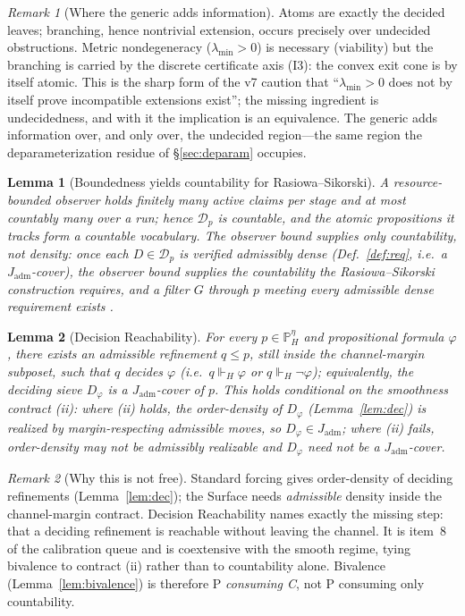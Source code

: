\documentclass[11pt]{article}
\newtheorem{lemma}{Lemma}
\theoremstyle{definition}
\theoremstyle{remark}
\newtheorem*{remark}{Remark}
\newcommand{\forcesH}{\Vdash_{H}}
\newcommand{\PHeta}{\mathbb{P}_{H}^{\eta}}
\newcommand{\refines}{\leq}
\newcommand{\lmin}{\lambda_{\min}}
\newcommand{\Jadm}{J_{\mathrm{adm}}}
\begin{document}
\begin{remark}[Where the generic adds information]
Atoms are exactly the decided leaves; branching, hence nontrivial extension, occurs precisely over
undecided obstructions. Metric nondegeneracy ($\lmin>0$) is necessary (viability) but the branching
is carried by the discrete certificate axis (I3): the convex exit cone is by itself atomic. This is
the sharp form of the v7 caution that ``$\lmin>0$ does not by itself prove incompatible extensions
exist''; the missing ingredient is undecidedness, and with it the implication is an equivalence. The
generic adds information over, and only over, the undecided region---the same region the
deparameterization residue of \S\ref{sec:deparam} occupies.
\end{remark}

\begin{lemma}[Boundedness yields countability for Rasiowa--Sikorski]\label{lem:bdd}
A resource-bounded observer holds finitely many active claims per stage and at most countably many
over a run; hence $\mathcal{D}_p$ is countable, and the atomic propositions it tracks form a countable
vocabulary. The observer bound supplies only \emph{countability}, not density: once each
$D\in\mathcal{D}_p$ is verified admissibly dense (Def.~\ref{def:req}, i.e.\ a $\Jadm$-cover), the
observer bound supplies the countability the Rasiowa--Sikorski construction requires, and a filter $G$
through $p$ meeting every admissible dense requirement exists \cite{rasiowa-sikorski,gpst}.
\end{lemma}

\begin{lemma}[Decision Reachability]\label{lem:reach}
For every $p\in\PHeta$ and propositional formula $\varphi$, there exists an admissible refinement
$q\refines p$, still inside the channel-margin subposet, such that $q$ decides $\varphi$ (i.e.\
$q\forcesH\varphi$ or $q\forcesH\neg\varphi$); equivalently, the deciding sieve $D_\varphi$ is a
$\Jadm$-cover of $p$. This holds \emph{conditional on the smoothness contract} (ii): where (ii) holds,
the order-density of $D_\varphi$ (Lemma~\ref{lem:dec}) is realized by margin-respecting admissible
moves, so $D_\varphi\in\Jadm$; where (ii) fails, order-density may not be admissibly realizable and
$D_\varphi$ need not be a $\Jadm$-cover.
\end{lemma}

\begin{remark}[Why this is not free]
Standard forcing gives order-density of deciding refinements (Lemma~\ref{lem:dec}); the Surface needs
\emph{admissible} density inside the channel-margin contract. Decision Reachability names exactly the
missing step: that a deciding refinement is reachable without leaving the channel. It is item~8 of the
calibration queue and is coextensive with the smooth regime, tying bivalence to contract (ii) rather
than to countability alone. Bivalence (Lemma~\ref{lem:bivalence}) is therefore P \emph{consuming C},
not P consuming only countability.
\end{remark}
\end{document}
